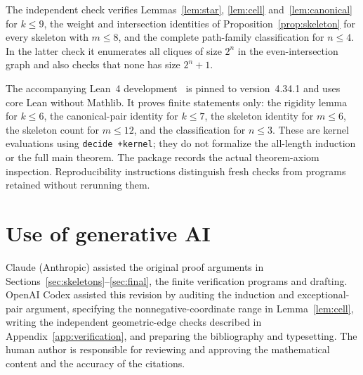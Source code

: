 \documentclass[screen]{aomart}
\theoremstyle{definition}
\theoremstyle{remark}
\numberwithin{equation}{section}
\begin{document}
The independent check verifies Lemmas~\ref{lem:star}, \ref{lem:cell} and~\ref{lem:canonical} for $k\le9$, the weight and intersection identities of Proposition~\ref{prop:skeleton} for every skeleton with $m\le8$, and the complete path-family classification for $n\le4$. In the latter check it enumerates all cliques of size $2^n$ in the even-intersection graph and also checks that none has size $2^n+1$.

The accompanying Lean~4 development~\cite{MU} is pinned to version~4.34.1 and uses core Lean without Mathlib. It proves finite statements only: the rigidity lemma for $k\le6$, the canonical-pair identity for $k\le7$, the skeleton identity for $m\le6$, the skeleton count for $m\le12$, and the classification for $n\le3$. These are kernel evaluations using \texttt{decide +kernel}; they do not formalize the all-length induction or the full main theorem. The package records the actual theorem-axiom inspection. Reproducibility instructions distinguish fresh checks from programs retained without rerunning them.

\section*{Use of generative AI}
Claude (Anthropic) assisted the original proof arguments in Sections~\ref{sec:skeletons}--\ref{sec:final}, the finite verification programs and drafting. OpenAI Codex assisted this revision by auditing the induction and exceptional-pair argument, specifying the nonnegative-coordinate range in Lemma~\ref{lem:cell}, writing the independent geometric-edge checks described in Appendix~\ref{app:verification}, and preparing the bibliography and typesetting. The human author is responsible for reviewing and approving the mathematical content and the accuracy of the citations.



\end{document}
